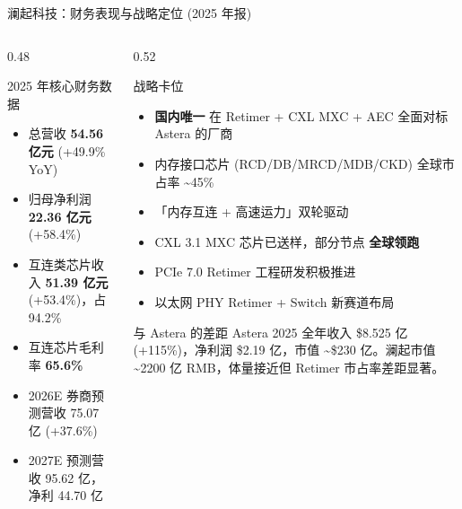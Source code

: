 \documentclass[aspectratio=169, 10pt, UTF8]{ctexbeamer}
\begin{document}
\begin{frame}{澜起科技：财务表现与战略定位 (2025 年报)}
  \begin{columns}[T]
    \begin{column}{0.48\textwidth}
      \begin{block}{2025 年核心财务数据}
        \begin{itemize}
          \item 总营收 \textbf{54.56 亿元} (+49.9\% YoY)
          \item 归母净利润 \textbf{22.36 亿元} (+58.4\%)
          \item 互连类芯片收入 \textbf{51.39 亿元} (+53.4\%)，占 94.2\%
          \item 互连芯片毛利率 \textbf{65.6\%}
          \item 2026E 券商预测营收 75.07 亿 (+37.6\%)
          \item 2027E 预测营收 95.62 亿，净利 44.70 亿
        \end{itemize}
      \end{block}
    \end{column}
    \begin{column}{0.52\textwidth}
      \begin{exampleblock}{战略卡位}
        \begin{itemize}
          \item \textbf{国内唯一} 在 Retimer + CXL MXC + AEC 全面对标 Astera 的厂商
          \item 内存接口芯片 (RCD/DB/MRCD/MDB/CKD) 全球市占率 \textasciitilde45\%
          \item 「内存互连 + 高速运力」双轮驱动
          \item CXL 3.1 MXC 芯片已送样，部分节点 \textbf{全球领跑}
          \item PCIe 7.0 Retimer 工程研发积极推进
          \item 以太网 PHY Retimer + Switch 新赛道布局
        \end{itemize}
      \end{exampleblock}

      \vspace{6pt}
      \begin{alertblock}{与 Astera 的差距}
        Astera 2025 全年收入 \$8.525 亿 (+115\%)，净利润 \$2.19 亿，市值 \textasciitilde\$230 亿。澜起市值 \textasciitilde2200 亿 RMB，体量接近但 Retimer 市占率差距显著。
      \end{alertblock}
    \end{column}
  \end{columns}
\end{frame}
\end{document}
